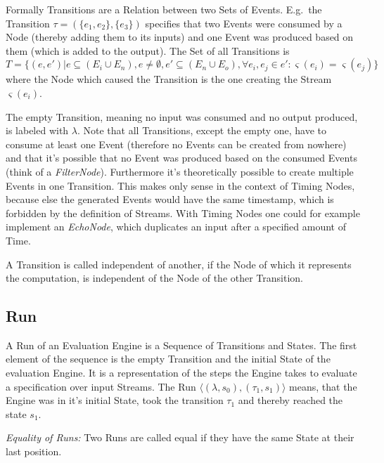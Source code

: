Formally Transitions are a Relation between two Sets of Events.
E.g.\ the Transition \(\tau = (\{e_1,e_2\}, \{e_3\})\) specifies that two Events were consumed by a Node (thereby adding them to its inputs) and one Event was produced based on them (which is added to the output).
The Set of all Transitions is
\[
  T = \{(e, e') | e \subseteq (E_i \cup E_n),e \neq \emptyset, e' \subseteq (E_n \cup E_o), \forall e_i, e_j \in e': \varsigma(e_i) = \varsigma(e_j)\}
\]
where the Node which caused the Transition is the one creating the Stream \(\varsigma(e_i)\).

The empty Transition, meaning no input was consumed and no output produced, is labeled with \(\lambda\).
Note that all Transitions, except the empty one, have to consume at least one Event (therefore no Events can be created from nowhere) and that it's possible that no Event was produced based on the consumed Events (think of a \emph{FilterNode}).
Furthermore it's theoretically possible to create multiple Events in one Transition.
This makes only sense in the context of Timing Nodes, because else the generated Events would have the same timestamp, which is forbidden by the definition of Streams.
With Timing Nodes one could for example implement an \emph{EchoNode}, which duplicates an input after a specified amount of Time.

\begin{definition}
  A Transition is called independent of another, if the Node of which it represents the computation, is independent of the Node of the other Transition.
\end{definition}


\subsection{Run}
\label{sec:concepts:def:run}

A Run of an Evaluation Engine is a Sequence of Transitions and States.
The first element of the sequence is the empty Transition and the initial State of the evaluation Engine.
It is a representation of the steps the Engine takes to evaluate a specification over input Streams.
The Run \(\langle (\lambda, s_0), (\tau_1, s_1) \rangle\) means, that the Engine was in it's initial State, took the transition \(\tau_1\) and thereby reached the state \(s_1\).

\begin{definition}
  \emph{Equality of Runs:} Two Runs are called equal if they have the same State at their last position.
\label{def:equal_runs}
\end{definition}

